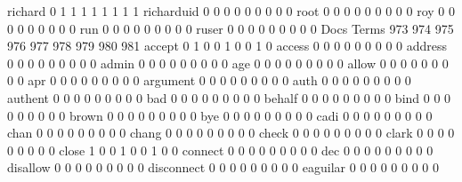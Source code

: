 \documentclass[compress,8pt]{beamer}
\begin{document}
\begin{frame}
\begin{Schunk}
  richard                                    0   1   1   1   1   1   1   1   1
  richarduid                                 0   0   0   0   0   0   0   0   0
  root                                       0   0   0   0   0   0   0   0   0
  roy                                        0   0   0   0   0   0   0   0   0
  run                                        0   0   0   0   0   0   0   0   0
  ruser                                      0   0   0   0   0   0   0   0   0
                                          Docs
Terms                                      973 974 975 976 977 978 979 980 981
  accept                                     0   1   0   0   1   0   0   1   0
  access                                     0   0   0   0   0   0   0   0   0
  address                                    0   0   0   0   0   0   0   0   0
  admin                                      0   0   0   0   0   0   0   0   0
  age                                        0   0   0   0   0   0   0   0   0
  allow                                      0   0   0   0   0   0   0   0   0
  apr                                        0   0   0   0   0   0   0   0   0
  argument                                   0   0   0   0   0   0   0   0   0
  auth                                       0   0   0   0   0   0   0   0   0
  authent                                    0   0   0   0   0   0   0   0   0
  bad                                        0   0   0   0   0   0   0   0   0
  behalf                                     0   0   0   0   0   0   0   0   0
  bind                                       0   0   0   0   0   0   0   0   0
  brown                                      0   0   0   0   0   0   0   0   0
  bye                                        0   0   0   0   0   0   0   0   0
  cadi                                       0   0   0   0   0   0   0   0   0
  chan                                       0   0   0   0   0   0   0   0   0
  chang                                      0   0   0   0   0   0   0   0   0
  check                                      0   0   0   0   0   0   0   0   0
  clark                                      0   0   0   0   0   0   0   0   0
  close                                      1   0   0   1   0   0   1   0   0
  connect                                    0   0   0   0   0   0   0   0   0
  dec                                        0   0   0   0   0   0   0   0   0
  disallow                                   0   0   0   0   0   0   0   0   0
  disconnect                                 0   0   0   0   0   0   0   0   0
  eaguilar                                   0   0   0   0   0   0   0   0   0

\end{Schunk}
\end{frame}
\end{document}

